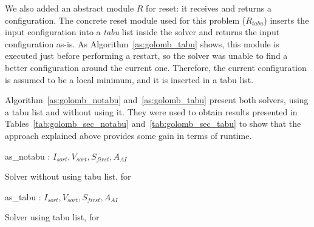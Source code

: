 We also added an abstract module $R$ for reset: it receives and returns a configuration. The concrete reset module used for this problem ($R_{tabu}$) inserts the input configuration into a \textit{tabu} list inside the solver and returns the input configuration as-is. As Algorithm~\ref{as:golomb_tabu} shows, this module is executed just before performing a restart, so the solver was unable to find a better configuration around the current one. Therefore, the current configuration is assumed to be a local minimum, and it is inserted in a tabu list.

Algorithm~\ref{as:golomb_notabu} and~\ref{as:golomb_tabu} present both solvers, using a tabu list and without using it. They were used to obtain results presented in Tables~\ref{tab:golomb_sec_notabu} and~\ref{tab:golomb_sec_tabu} to show that the approach explained above provides some gain in terms of runtime. 

\begin{algorithm}[H]
\dontprintsemicolon
\SetNoline
{}
   as\_notabu\;
\algoindent {} : $I_{sort}, V_{sort}, S_{first}, A_{AI}$ \;
\caption{Solver without using tabu list, for \GRP}\label{as:golomb_notabu}
\end{algorithm}

\begin{algorithm}[H]
\dontprintsemicolon
\SetNoline
{}
   as\_tabu\;
\algoindent {} : $I_{sort}, V_{sort}, S_{first}, A_{AI}$ \;
\caption{Solver using tabu list, for \GRP}\label{as:golomb_tabu}
\end{algorithm}

